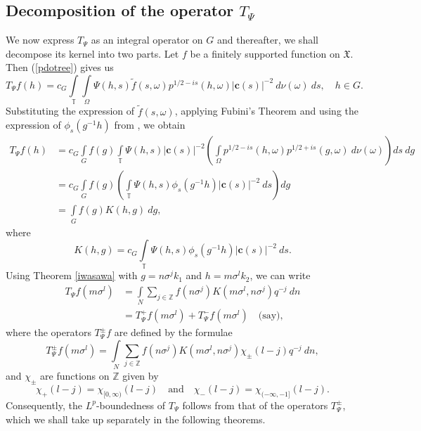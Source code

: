 \documentclass[12pt,reqno]{amsart}
\theoremstyle{definition}
\theoremstyle{definition}
\numberwithin{equation}{section}
\begin{document}
\subsection{Decomposition of the operator \texorpdfstring{$T_\Psi$}{tpsi}}
We now express $T_\Psi$ as an integral operator on $G$ and thereafter, we shall decompose its kernel into two parts. Let $f$ be a finitely supported function on $\mathfrak{X}$. Then (\ref{pdotree}) gives us
$$T_{\Psi}f(h)=c_{G}\int\limits_{\mathbb{T}}\int\limits_{\Omega}\Psi(h,s)\widetilde{f}(s,\omega)p^{1/2-is}(h,\omega)|\mathbf{c}(s)|^{-2}~d\nu(\omega)~ds,\quad h\in G.$$
Substituting the expression of $\widetilde{f}(s,\omega)$, applying Fubini's Theorem and using the expression of $\phi_{s}(g^{-1}h)$ from \cite[Page 55]{Alessandro_Nebbia}, we obtain
\begin{align*}
	T_{\Psi}f(h)&=c_{G}\int\limits_{G}f(g)\int\limits_{\mathbb{T}}\Psi(h,s)|\mathbf{c}(s)|^{-2}\left(\int\limits_{\Omega}p^{1/2-is}(h,\omega)p^{1/2+is}(g,\omega)~d\nu(\omega)\right)ds~dg\\
	&=c_{G}\int\limits_{G}f(g)\left(\int\limits_{\mathbb{T}}\Psi(h,s)\phi_{s}(g^{-1}h)|\mathbf{c}(s)|^{-2}~ds\right)dg\\
	&=\int\limits_{G}f(g)K(h,g)~dg,
\end{align*}
where
\begin{equation}\label{pdokernel}
	K(h,g)=c_{G}\int\limits_{\mathbb{T}}\Psi(h,s)\phi_{s}(g^{-1}h)|\mathbf{c}(s)|^{-2}~ds.
\end{equation}
Using Theorem \ref{iwasawa} with $g=n\sigma^{j}k_{1}$ and $h=m\sigma^{l}k_{2}$, we can write
\begin{equation}\label{eqn_1st_defn_T_Psi}
	\begin{aligned}
T_{\Psi}f(m\sigma^{l})&=\int\limits_{N}\sum\limits_{j\in\mathbb{Z}}f(n\sigma^{j})K(m\sigma^{l},n\sigma^{j})q^{-j}~dn\\
&=T_{\Psi}^{+}f(m\sigma^{l})+T_{\Psi}^{-}f(m\sigma^{l})\quad\text{(say)},
\end{aligned}
\end{equation}
where the operators $T_{\Psi}^{\pm}f$ are defined by the formulae
\begin{equation}\label{tpsipm}
	T_{\Psi}^{\pm}f(m\sigma^{l})=\int\limits_{N}\sum\limits_{j\in\mathbb{Z}}f(n\sigma^{j})K(m\sigma^{l},n\sigma^{j})\chi_{\pm}(l-j)q^{-j}~dn,
\end{equation}
and $\chi_{\pm}$ are functions on $\mathbb{Z}$ given by
$$\chi_{+}(l-j)=\chi_{[0,\infty)}(l-j)\quad\text{and}\quad\chi_{-}(l-j)=\chi_{(-\infty,-1]}(l-j).$$
Consequently, the $L^{p}$-boundedness of $T_{\Psi}$ follows from that of the operators $T_{\Psi}^{\pm}$, which we shall take up separately in the following theorems.
\end{document}
